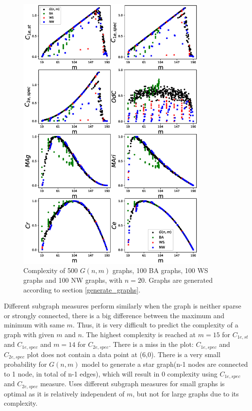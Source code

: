 \documentclass[12pt]{article}
\begin{document}
\noindent
\newpage
\begin{figure}[p!]
    \centering
    \vspace*{-2in}
    \includegraphics[width = 0.85\textwidth]{complexities_sp.eps}
    \vspace*{-0.8in}
    \caption{Complexity of 500 $G(n,m)$ graphs, 100 BA graphs, 100 WS graphs and 100 NW graphs, with $n=20$. Graphs are generated according to section \ref{generate_graphs}.}
    \label{fig:graph_models}
\end{figure}

Different subgraph measures perform similarly when the graph is neither sparse or strongly connected, there is a big difference between the maximum and minimum with same $m$. Thus, it is very difficult to predict the complexity of a graph with given $m$ and $n$. The highest complexity is reached at $m=15$ for $C_{1e,st}$ and $C_{1e,spec}$ and $m=14$ for $C_{2e,spec}$. There is a miss in the plot: $C_{1e,spec}$ and $C_{2e,spec}$ plot does not contain a data point at (6,0). There is a very small probability for $G(n,m)$ model to generate a star graph(n-1 nodes are connected to 1 node, in total of n-1 edges), which will result in 0 complexity using $C_{1e,spec}$ and $C_{2e,spec}$ measure. Uses different subgraph measures for small graphs is optimal as it is relatively independent of $m$, but not for large graphs due to its complexity.\par
\end{document}
